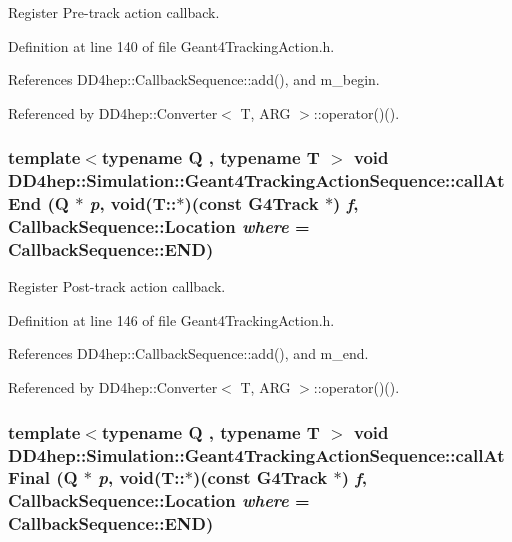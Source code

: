 Register Pre-\/track action callback. 

Definition at line 140 of file Geant4TrackingAction.h.

References DD4hep::CallbackSequence::add(), and m\_\-begin.

Referenced by DD4hep::Converter$<$ T, ARG $>$::operator()().\hypertarget{class_d_d4hep_1_1_simulation_1_1_geant4_tracking_action_sequence_ab9c75782af8475ae3fa3148229cafb9d}{
\subsubsection[{callAtEnd}]{\setlength{\rightskip}{0pt plus 5cm}template$<$typename Q , typename T $>$ void DD4hep::Simulation::Geant4TrackingActionSequence::callAtEnd (Q $\ast$ {\em p}, \/  void(T::$\ast$)(const G4Track $\ast$) {\em f}, \/  {\bf CallbackSequence::Location} {\em where} = {\ttfamily CallbackSequence::END})}}
\label{class_d_d4hep_1_1_simulation_1_1_geant4_tracking_action_sequence_ab9c75782af8475ae3fa3148229cafb9d}


Register Post-\/track action callback. 

Definition at line 146 of file Geant4TrackingAction.h.

References DD4hep::CallbackSequence::add(), and m\_\-end.

Referenced by DD4hep::Converter$<$ T, ARG $>$::operator()().\hypertarget{class_d_d4hep_1_1_simulation_1_1_geant4_tracking_action_sequence_af6fafbf683753a13464ef9def5579644}{
\subsubsection[{callAtFinal}]{\setlength{\rightskip}{0pt plus 5cm}template$<$typename Q , typename T $>$ void DD4hep::Simulation::Geant4TrackingActionSequence::callAtFinal (Q $\ast$ {\em p}, \/  void(T::$\ast$)(const G4Track $\ast$) {\em f}, \/  {\bf CallbackSequence::Location} {\em where} = {\ttfamily CallbackSequence::END})}}
\label{class_d_d4hep_1_1_simulation_1_1_geant4_tracking_action_sequence_af6fafbf683753a13464ef9def5579644}


